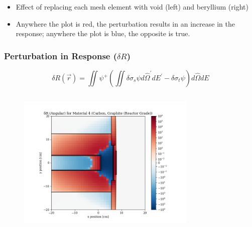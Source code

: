 \documentclass[t]{beamer}
\begin{document}
\begin{frame}
\begin{columns}
\begin{figure}
    \end{figure}
  \end{columns}
  \begin{itemize}
    \item Effect of replacing each mesh element with void (left) and beryllium
          (right)
    \item Anywhere the plot is red, the perturbation results in an increase in
          the response; anywhere the plot is blue, the opposite is true.
  \end{itemize}
\end{frame}

\begin{frame}
  \frametitle{Perturbation in Response ($\delta R$)}
  \vskip-0.25in
  \begin{equation*}
    \delta R\left(\vec{r}\right) = \iint\psi^+\left(\iint\delta\sigma_s\psi d\hat{\Omega}^\prime dE^\prime - \delta\sigma_t\psi\right)d\hat{\Omega}dE
  \end{equation*}
  \vskip-0.25in
  \begin{columns}
    \begin{figure}
      \includegraphics[trim={0.7in 0.15in 1.05in 0.4in},clip,scale=0.36]{images/dR_angular_04.png}
    \end{figure}
    \begin{figure}

\end{figure}
\end{columns}
\end{frame}
\end{document}
